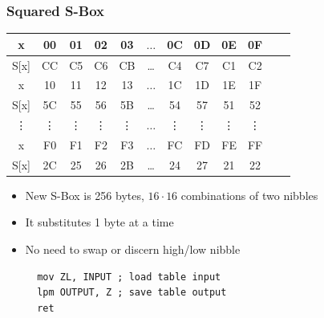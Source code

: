 \documentclass{beamer}
\begin{document}
\begin{frame}[fragile]
\frametitle{Squared S-Box}
\begin{tabular}{| c | c  | c | c | c  | c  | c | c | c  | c | c | c |}
\hline
  x & 00 & 01 & 02 & 03  &  $\dots$  & 0C & 0D & 0E & 0F   \\
\hline
 S[x] & CC & C5 & C6 & CB & \dots & C4 & C7 & C1 & C2   \\
\hline
  x & 10 & 11 & 12 & 13  &  $\dots$  & 1C & 1D & 1E & 1F   \\
\hline
 S[x] & 5C & 55 & 56 & 5B & \dots & 54 & 57 & 51 & 52   \\
\hline
  \vdots & \vdots & \vdots & \vdots & \vdots  &  $\dots$  & \vdots &\vdots & \vdots & \vdots   \\
\hline
  x & F0 & F1 & F2 & F3  &  $\dots$  & FC & FD & FE & FF   \\
\hline
 S[x] & 2C & 25 & 26 & 2B & \dots & 24 & 27 & 21 & 22   \\
\hline
\end{tabular}
\pause
\begin{itemize}[<+->]
\item New S-Box is 256 bytes, $16\cdot16$ combinations of two nibbles
\item It substitutes 1 byte at a time
\item No need to swap or discern high/low nibble
  \begin{lstlisting}
  mov ZL, INPUT ; load table input
  lpm OUTPUT, Z ; save table output
  ret
  \end{lstlisting}
\end{itemize}
\end{frame}
\end{document}
